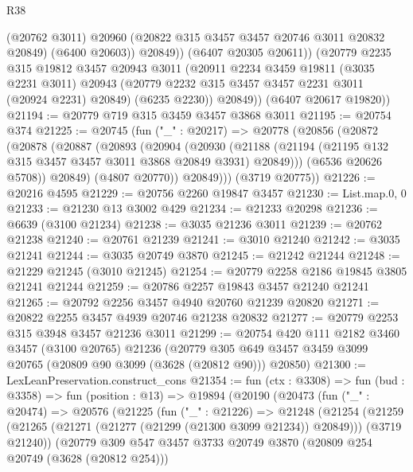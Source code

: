 \begin{lexlean}{R38}
\begin{coremodule}
                (@20762 @3011)
                @20960
                (@20822 @315 @3457 @3457 @20746 @3011 @20832 @20849)
                (@6400 @20603))
              @20849))
          (@6407 @20305 @20611))
        (@20779
          @2235
          @315
          @19812
          @3457
          @20943
          @3011
          (@20911
            @2234
            @3459
            @19811
            (@3035 @2231 @3011)
            @20943
            (@20779 @2232 @315 @3457 @3457 @2231 @3011 (@20924 @2231) @20849)
            (@6235 @2230))
          @20849))
      (@6407 @20617 @19820))
@21194 := @20779 @719 @315 @3459 @3457 @3868 @3011
@21195 := @20754 @374
@21225 := @20745
    (fun ("_" : @20217) =>
    @20778
      (@20856
        (@20872
          (@20878
            (@20887
              (@20893
                (@20904
                  (@20930
                    (@21188
                      (@21194 (@21195 @132 @315 @3457 @3457 @3011 @3868 @20849 @3931) @20849)))
                  (@6536 @20626 @5708))
                @20849)
              (@4807 @20770))
            @20849)))
      (@3719 @20775))
@21226 := @20216 @4595
@21229 := @20756 @2260 @19847 @3457
@21230 := List.map.{0, 0}
@21233 := @21230 @13 @3002 @429
@21234 := @21233 @20298
@21236 := @6639 (@3100 @21234)
@21238 := @3035 @21236 @3011
@21239 := @20762 @21238
@21240 := @20761 @21239
@21241 := @3010 @21240
@21242 := @3035 @21241
@21244 := @3035 @20749 @3870
@21245 := @21242 @21244
@21248 := @21229 @21245 (@3010 @21245)
@21254 := @20779 @2258 @2186 @19845 @3805 @21241 @21244
@21259 := @20786 @2257 @19843 @3457 @21240 @21241
@21265 := @20792 @2256 @3457 @4940 @20760 @21239 @20820
@21271 := @20822 @2255 @3457 @4939 @20746 @21238 @20832
@21277 := @20779 @2253 @315 @3948 @3457 @21236 @3011
@21299 := @20754
    @420
    @111
    @2182
    @3460
    @3457
    (@3100 @20765)
    @21236
    (@20779 @305 @649 @3457 @3459 @3099 @20765 (@20809 @90 @3099 (@3628 (@20812 @90))) @20850)
@21300 := LexLeanPreservation.construct_cons
@21354 := fun (ctx : @3308) =>
  fun (bud : @3358) =>
  fun (position : @13) =>
  @19894
    (@20190
      (@20473
        (fun ("_" : @20474) =>
        @20576
          (@21225
            (fun ("_" : @21226) =>
            @21248
              (@21254
                (@21259
                  (@21265 (@21271 (@21277 (@21299 (@21300 @3099 @21234)) @20849)))
                  (@3719 @21240))
                (@20779
                  @309
                  @547
                  @3457
                  @3733
                  @20749
                  @3870
                  (@20809 @254 @20749 (@3628 (@20812 @254)))

\end{coremodule}
\end{lexlean}
